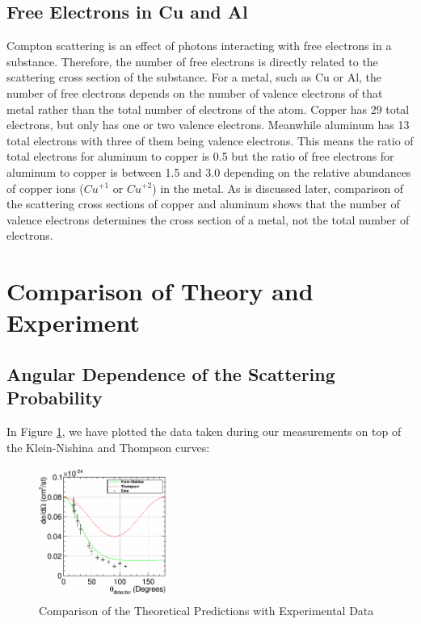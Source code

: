 \documentclass[%
 reprint,
 amsmath,amssymb,
 aps,
 pra,
]{revtex4-1}
\begin{document}
\subsection{Free Electrons in Cu and Al}
Compton scattering is an effect of photons interacting with free electrons in a substance. Therefore, the number of free electrons is directly related to the scattering cross section of the substance. For a metal, such as Cu or Al, the number of free electrons depends on the number of valence electrons of that metal rather than the total number of electrons of the atom. Copper has 29 total electrons, but only has one or two valence electrons. Meanwhile aluminum has 13 total electrons with three of them being valence electrons. This means the ratio of total electrons for aluminum to copper is 0.5 but the ratio of free electrons for aluminum to copper is between 1.5 and 3.0 depending on the relative abundances of copper ions ($Cu^{+1}$ or $Cu^{+2}$) in the metal. As is discussed later, comparison of the scattering cross sections of copper and aluminum shows that the number of valence electrons determines the cross section of a metal, not the total number of electrons.

\section{Comparison of Theory and Experiment}

\subsection{Angular Dependence of the Scattering Probability}

In Figure \ref{KN_vs_Thompson_Unscaled}, we have plotted the data taken during our measurements on top of the Klein-Nishina and Thompson curves:

\begin{figure}[H]
	\centering
	\includegraphics[width=0.4\textwidth]{KNvsThompson_Unscaled.png}
	\caption{Comparison of the Theoretical Predictions with Experimental Data}
	\label{KN_vs_Thompson_Unscaled}
\end{figure}
\end{document}
